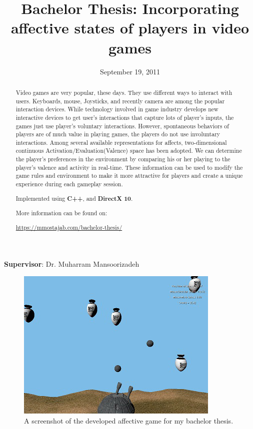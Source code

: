 \documentclass[]{article}
\title{Bachelor Thesis: Incorporating affective states of players in video games}
\date{September 19, 2011}
\begin{document}
\maketitle

\begin{description}
	\centering
	\item[] \textbf{Supervisor}: Dr. Muharram Mansoorizadeh
\end{description}

\begin{abstract}

Video games are very popular, these days. They use different ways to interact with users. Keyboards, mouse, Joysticks, and recently camera are among the popular interaction devices. While technology involved in game industry develops new interactive devices to get user's interactions that capture lots of player's inputs, the games just use player's voluntary interactions. However, spontaneous behaviors of players are of much value in playing games, the players do not use involuntary interactions. Among several available representations for affects, two-dimensional continuous Activation/Evaluation(Valence) space has been adopted. We can determine the player's preferences in the environment by comparing his or her playing to the player's valence and activity in real-time. These information can be used to modify the game rules and environment to make it more attractive for players and create a unique experience during each gameplay session.\newline


Implemented using \textbf{C++}, and \textbf{DirectX 10}.\newline

More information can be found on:\

\href{https://mmostajab.com/bachelor-thesis/}{https://mmostajab.com/bachelor-thesis/}

\end{abstract}


\begin{figure}[ht!]
	\centering
	\includegraphics[width=0.4\linewidth]{stressbasedgame.jpg}
	\caption{A screenshot of the developed affective game for my bachelor thesis.}
	\label{fig:boat1}
\end{figure}
\end{document}
